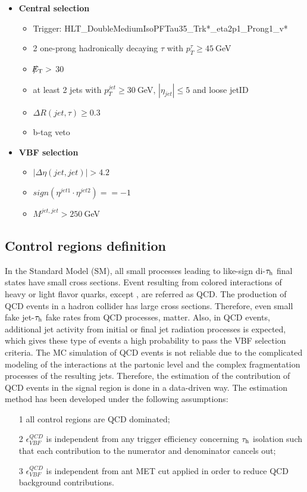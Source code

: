 \begin{itemize}
	\item \textbf{Central selection}
	\begin{itemize}
		\item Trigger: HLT\_DoubleMediumIsoPFTau35\_Trk*\_eta2p1\_Prong1\_v*
		\item 2 one-prong hadronically decaying $\tau$ with $p_{T}^{\tau}\geq45~$GeV 
		\item $\slash\mkern-12mu{E}_{\text{T}} > $ 30
		\item at least 2 jets with $p_{T}^{jet}\geq30~$GeV, $|\eta_{jet}|\leq5$ and loose jetID
		\item $\Delta R(jet,\tau)\geq0.3$
		\item b-tag veto
	\end{itemize}
	\item \textbf{VBF selection}
	\begin{itemize}
		\item $|\Delta\eta(jet,jet)| > 4.2$
		\item $sign(\eta^{jet 1}\cdot\eta^{jet 2})==-1$
		\item $M^{jet,jet}>250~$GeV
	\end{itemize}
\end{itemize}

\subsection{Control regions definition} \label{sec:crsdef}


In the Standard Model (SM), all small processes leading to like-sign di-$\tau_{\text{h}}$ final states have small cross sections. Event resulting from colored interactions of heavy or light flavor quarks, except \ttbar, are referred as QCD. The production of QCD events in a hadron collider has large cross sections. Therefore, even small fake jet-$\tau_{\text{h}}$ fake rates from QCD processes, matter. Also, in QCD events, additional jet activity from initial or final jet radiation processes is expected, which gives these type of events a high probability to pass the VBF selection criteria.
The MC simulation of QCD events is not reliable due to the complicated modeling of the interactions at the partonic level and the complex fragmentation processes of the resulting jets. Therefore, the estimation of the contribution of QCD events in the signal region is done in a data-driven way. The estimation method has been developed under the following assumptions:
\begin{itemize}
\item[1] all control regions are QCD dominated;
\item[2] $\epsilon^{QCD}_{VBF}$ is independent from any trigger efficiency concerning $\tau_{\text{h}}$ isolation such that each contribution to the numerator and denominator cancels out;
\item[3] $\epsilon^{QCD}_{VBF}$ is independent from ant MET cut applied in order to reduce QCD background contributions. 
\end{itemize}

